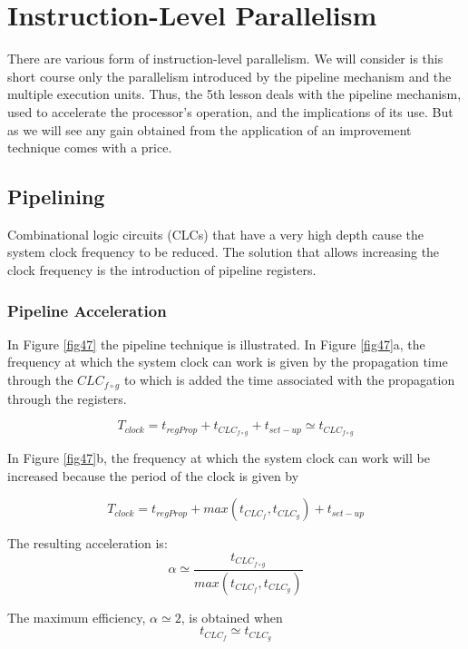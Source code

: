 \chapter{Instruction-Level Parallelism}\label{lect5}
\localtoc

There are various form of instruction-level parallelism. We will consider is this short course only the parallelism introduced by the pipeline mechanism and the multiple execution units.
Thus, the 5th lesson deals with the pipeline mechanism, used to accelerate the processor's operation, and the implications of its use. But as we will see any gain obtained from the application of an improvement technique comes with a price.

\section{Pipelining}

Combinational logic circuits (CLCs) that have a very high depth cause the system clock frequency to be reduced. The solution that allows increasing the clock frequency is the introduction of pipeline registers.


\subsection{Pipeline Acceleration}

In Figure \ref{fig47} the pipeline technique is illustrated. In Figure \ref{fig47}a, the frequency at which the system clock can work is given by the propagation time through the $CLC_{f \circ g}$ to which is added the time associated with the propagation through the registers.



$$T_{clock} = t_{regProp} + t_{CLC_{f \circ g}} + t_{set-up} \simeq t_{CLC_{f \circ g}}$$

In Figure \ref{fig47}b,  the frequency at which the system clock can work will be increased because the period of the clock is given by

$$T_{clock} = t_{regProp} + max(t_{CLC_{f}}, t_{CLC_{g}}) + t_{set-up}$$

The resulting acceleration is:
$$\alpha \simeq \frac{t_{CLC_{f \circ g}}}{max(t_{CLC_{f}}, t_{CLC_{g}})}$$

The maximum efficiency, $\alpha \simeq 2$, is obtained when
$$t_{CLC_{f}} \simeq t_{CLC_{g}}$$

